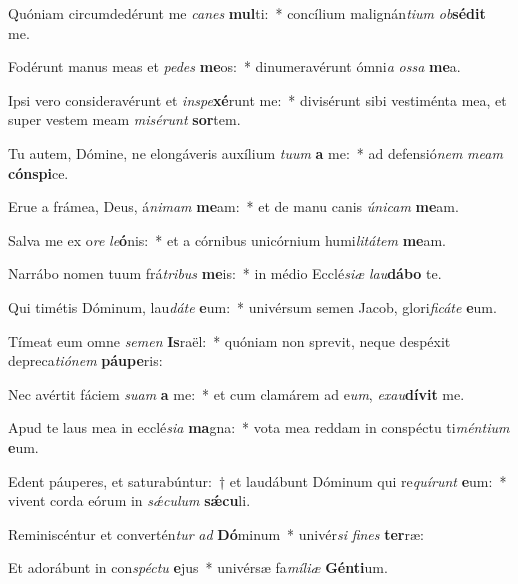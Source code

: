 \item Quóniam circumdedérunt me \textit{ca}\textit{nes} \textbf{mul}ti:~* concílium malignán\textit{ti}\textit{um} \textit{ob}\textbf{sé}\textbf{dit} me.
\item Fodérunt manus meas et \textit{pe}\textit{des} \textbf{me}os:~* dinumeravérunt ómni\textit{a} \textit{os}\textit{sa} \textbf{me}a.
\item Ipsi vero consideravérunt et \textit{in}\textit{spe}\textbf{xé}runt me:~* divisérunt sibi vestiménta mea, et super vestem meam \textit{mi}\textit{sé}\textit{runt} \textbf{sor}tem.
\item Tu autem, Dómine, ne elongáveris auxílium \textit{tu}\textit{um} \textbf{a} me:~* ad defensió\textit{nem} \textit{me}\textit{am} \textbf{cón}\textbf{spi}ce.
\item Erue a frámea, Deus, á\textit{ni}\textit{mam} \textbf{me}am:~* et de manu canis \textit{ú}\textit{ni}\textit{cam} \textbf{me}am.
\item Salva me ex o\textit{re} \textit{le}\textbf{ó}nis:~* et a córnibus unicórnium humi\textit{li}\textit{tá}\textit{tem} \textbf{me}am.
\item Narrábo nomen tuum frá\textit{tri}\textit{bus} \textbf{me}is:~* in médio Ecclé\textit{si}\textit{æ} \textit{lau}\textbf{dá}\textbf{bo} te.
\item Qui timétis Dóminum, lau\textit{dá}\textit{te} \textbf{e}um:~* univérsum semen Jacob, glori\textit{fi}\textit{cá}\textit{te} \textbf{e}um.
\item Tímeat eum omne \textit{se}\textit{men} \textbf{Is}raël:~* quóniam non sprevit, neque despéxit depreca\textit{ti}\textit{ó}\textit{nem} \textbf{páu}\textbf{pe}ris:
\item Nec avértit fáciem \textit{su}\textit{am} \textbf{a} me:~* et cum clamárem ad e\textit{um}, \textit{ex}\textit{au}\textbf{dí}\textbf{vit} me.
\item Apud te laus mea in ecclé\textit{si}\textit{a} \textbf{ma}gna:~* vota mea reddam in conspéctu ti\textit{mén}\textit{ti}\textit{um} \textbf{e}um.
\item Edent páuperes, et saturabúntur:~† et laudábunt Dóminum qui re\textit{quí}\textit{runt} \textbf{e}um:~* vivent corda eórum in \textit{sǽ}\textit{cu}\textit{lum} \textbf{sǽ}\textbf{cu}li.
\item Reminiscéntur et convertén\textit{tur} \textit{ad} \textbf{Dó}minum~* univér\textit{si} \textit{fi}\textit{nes} \textbf{ter}ræ:
\item Et adorábunt in con\textit{spéc}\textit{tu} \textbf{e}jus~* univérsæ fa\textit{mí}\textit{li}\textit{æ} \textbf{Gén}\textbf{ti}um.
